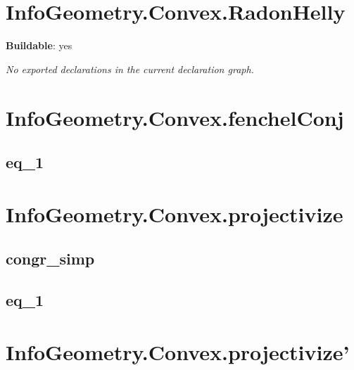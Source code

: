 \section{InfoGeometry.Convex.RadonHelly}

\noindent\textbf{Buildable}: yes

\noindent\emph{No exported declarations in the current declaration graph.}

\section{InfoGeometry.Convex.fenchelConj}

\subsection*{eq_1}

\begin{theorem}[blueprint="infogeometry:convex:fenchelconj:eq_1"]
\end{theorem}

\section{InfoGeometry.Convex.projectivize}

\subsection*{congr_simp}

\begin{theorem}[blueprint="infogeometry:convex:projectivize:congr_simp"]
\end{theorem}

\subsection*{eq_1}

\begin{theorem}[blueprint="infogeometry:convex:projectivize:eq_1"]
\end{theorem}

\section{InfoGeometry.Convex.projectivize'}

